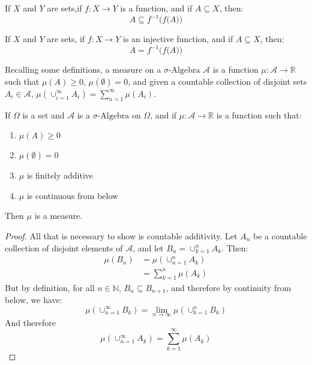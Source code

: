     \begin{theorem}
        If $X$ and $Y$ are sets,if
        $f:X\rightarrow{Y}$ is a function, and if
        $A\subseteq{X}$, then:
        \begin{equation}
            A\subseteq{f^{-1}\Big(f\big(A\big)\Big)}
        \end{equation}
    \end{theorem}
    \begin{theorem}
        If $X$ and $Y$ are sets, if
        $f:X\rightarrow{Y}$ is an injective function,
        and if $A\subseteq{X}$, then:
        \begin{equation}
            A=f^{-1}\Big(f\big(A\big)\Big)
        \end{equation}
    \end{theorem}
    Recalling some definitions, a measure on a
    $\sigma\textrm{-Algebra}$ $\mathcal{A}$ is a function
    $\mu:\mathcal{A}\rightarrow\mathbb{R}$ such that
    $\mu(A)\geq{0}$, $\mu(\emptyset)=0$, and given a countable
    collection of disjoint sets $A_{i}\in\mathcal{A}$,
    $\mu(\cup_{i=1}^{\infty}A_{i})=\sum_{n=1}^{\infty}\mu(A_{i})$.
    \begin{theorem}
        If $\Omega$ is a set and $\mathcal{A}$ is a
        $\sigma\text{-Algebra}$ on $\Omega$, and if
        $\mu:\mathcal{A}\rightarrow\mathbb{R}$ is a function such that:
        \begin{enumerate}
            \item $\mu(A)\geq{0}$
            \item $\mu(\emptyset)=0$
            \item $\mu$ is finitely additive
            \item $\mu$ is continuous from below
        \end{enumerate}
        Then $\mu$ is a measure.
    \end{theorem}
    \begin{proof}
        All that is necessary to show is countable additivity.
        Let $A_{n}$ be a countable collection of disjoint elements
        of $\mathcal{A}$, and let $B_{n}=\cup_{k=1}^{n}A_{k}$.
        Then:
        \begin{align}
            \mu(B_{n})&=\mu(\cup_{n=1}^{n}A_{k})\\
            &=\sum_{k=1}^{n}\mu(A_{k})
        \end{align}
        But by definition, for all $n\in\mathbb{N}$,
        $B_{n}\subseteq{B_{n+1}}$, and therefore by continuity from
        below, we have:
        \begin{equation}
            \mu(\cup_{n=1}^{\infty}B_{k})
            =\lim_{n\rightarrow\infty}\mu(\cup_{k=1}^{n}B_{k})
        \end{equation}
        And therefore
        \begin{equation}
            \mu(\cup_{n=1}^{\infty}A_{k})=
            \sum_{k=1}^{\infty}\mu(A_{k})
        \end{equation}
    \end{proof}
